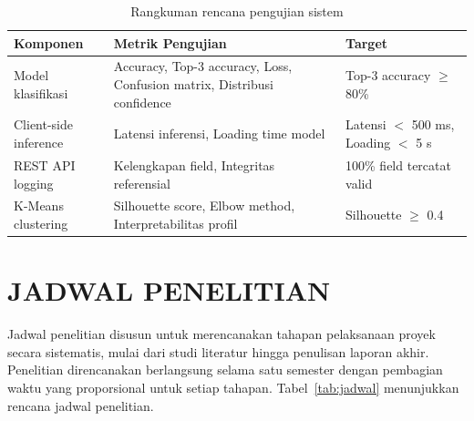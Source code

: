 \documentclass[12pt,oneside]{report}
\begin{document}
\begin{table}[H]
\centering
\caption{Rangkuman rencana pengujian sistem}
\label{tab:rencana-pengujian}
\small
\begin{tabularx}{\textwidth}{|l|X|X|}
\hline
\textbf{Komponen} & \textbf{Metrik Pengujian} & \textbf{Target} \\
\hline
Model klasifikasi & Accuracy, Top-3 accuracy, Loss, Confusion matrix, Distribusi confidence & Top-3 accuracy $\geq$ 80\% \\
\hline
Client-side inference & Latensi inferensi, Loading time model & Latensi $<$ 500 ms, Loading $<$ 5 s \\
\hline
REST API logging & Kelengkapan field, Integritas referensial & 100\% field tercatat valid \\
\hline
K-Means clustering & Silhouette score, Elbow method, Interpretabilitas profil & Silhouette $\geq$ 0.4 \\
\hline
\end{tabularx}
\end{table}

\section{JADWAL PENELITIAN}
\label{sec:jadwal-penelitian}

Jadwal penelitian disusun untuk merencanakan tahapan pelaksanaan proyek secara sistematis, mulai dari studi literatur hingga penulisan laporan akhir. Penelitian direncanakan berlangsung selama satu semester dengan pembagian waktu yang proporsional untuk setiap tahapan. Tabel~\ref{tab:jadwal} menunjukkan rencana jadwal penelitian.
\end{document}
